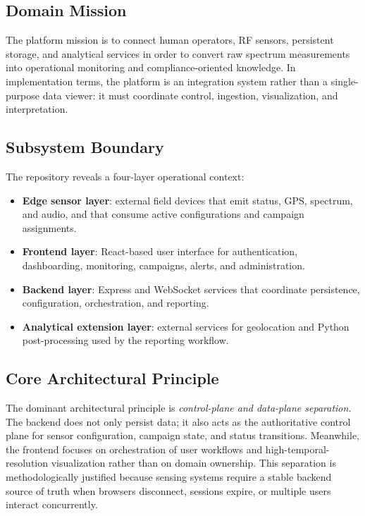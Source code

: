 \documentclass[11pt,a4paper]{article}
\begin{document}
\subsection{Domain Mission}
The platform mission is to connect human operators, RF sensors, persistent storage, and analytical services in order to convert raw spectrum measurements into operational monitoring and compliance-oriented knowledge. In implementation terms, the platform is an integration system rather than a single-purpose data viewer: it must coordinate control, ingestion, visualization, and interpretation.

\subsection{Subsystem Boundary}
The repository reveals a four-layer operational context:

\begin{itemize}
  \item \textbf{Edge sensor layer}: external field devices that emit status, GPS, spectrum, and audio, and that consume active configurations and campaign assignments.
  \item \textbf{Frontend layer}: React-based user interface for authentication, dashboarding, monitoring, campaigns, alerts, and administration.
  \item \textbf{Backend layer}: Express and WebSocket services that coordinate persistence, configuration, orchestration, and reporting.
  \item \textbf{Analytical extension layer}: external services for geolocation and Python post-processing used by the reporting workflow.
\end{itemize}

\subsection{Core Architectural Principle}
The dominant architectural principle is \textit{control-plane and data-plane separation}. The backend does not only persist data; it also acts as the authoritative control plane for sensor configuration, campaign state, and status transitions. Meanwhile, the frontend focuses on orchestration of user workflows and high-temporal-resolution visualization rather than on domain ownership. This separation is methodologically justified because sensing systems require a stable backend source of truth when browsers disconnect, sessions expire, or multiple users interact concurrently.
\end{document}
